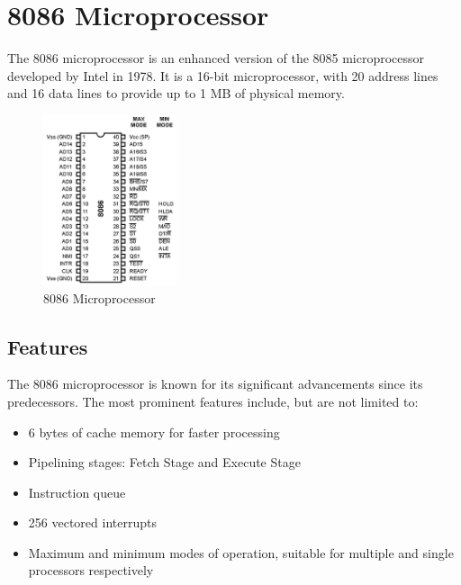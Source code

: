 \newpage
\section{8086 Microprocessor}
The 8086 microprocessor is an enhanced version of the 8085 microprocessor developed by Intel in 1978. It is a 16-bit microprocessor, with 20 address lines and 16 data lines to provide up to 1 MB of physical memory. 

    \begin{figure}[h]
        \begin{center}
            \includegraphics[width=0.35\textwidth]{figures/01_8086.png}
            \caption{8086 Microprocessor} \label{fig:8086}
        \end{center}
    \end{figure}

    \subsection{Features}
    The 8086 microprocessor is known for its significant advancements since its predecessors. The most prominent features include, but are not limited to:

    \begin{itemize}

        \item 6 bytes of cache memory for faster processing

        \item Pipelining stages: Fetch Stage and Execute Stage

        \item Instruction queue

        \item 256 vectored interrupts

        \item Maximum and minimum modes of operation, suitable for multiple and single processors respectively

    \end{itemize}

